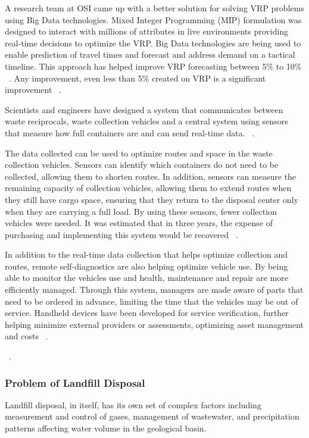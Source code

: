 \documentclass[sigconf]{acmart}
\begin{document}
A research team at OSI came up with a better solution for solving VRP problems using Big Data technologies. Mixed Integer Programming (MIP) formulation was designed to interact with millions of attributes in live environments providing real-time decisions to optimize the VRP. Big Data technologies are being used to enable prediction of travel times and forecast and address demand on a tactical timeline. This approach has helped improve VRP forecasting between  5\% to 10\% ~\cite{vijay2013}. Any improvement, even less than 5\% created on VRP is a significant improvement ~\cite{hasle2007}.

Scientists and engineers have designed a system that communicates between waste reciprocals, waste collection vehicles and a central system using sensors that measure how full containers are and can send real-time data.  ~\cite{faccio2011}.

The data collected can be used to optimize routes and space in the waste collection vehicles.  Sensors can identify which containers do not need to be collected, allowing them to shorten routes.  In addition, sensors can measure the remaining capacity of collection vehicles, allowing them to extend routes when they still have cargo space, ensuring that they return to the disposal center only when they are carrying a full load.  By using these sensors, fewer collection vehicles were needed.  It was estimated that in three years, the expense of purchasing and implementing this system would be recovered  ~\cite{shahrokni2014big}.

In addition to the real-time data collection that helps optimize collection and routes, remote self-diagnostics are also helping optimize vehicle use.  By being able to monitor the vehicles use and health, maintenance and repair are more efficiently managed.  Through this system, managers are made aware of parts that need to be ordered in advance, limiting the time that the vehicles may be out of service.  Handheld devices have been developed for service verification, further helping minimize external providers or assessments, optimizing asset management and costs ~\cite{megan2017}.


~\cite{shahrokni2014big}.

\subsubsection{Problem of Landfill Disposal}

Landfill disposal, in itself, has its own set of complex factors including measurement and control of gases, management of wastewater, and precipitation patterns affecting water volume in the geological basin.  
\end{document}
